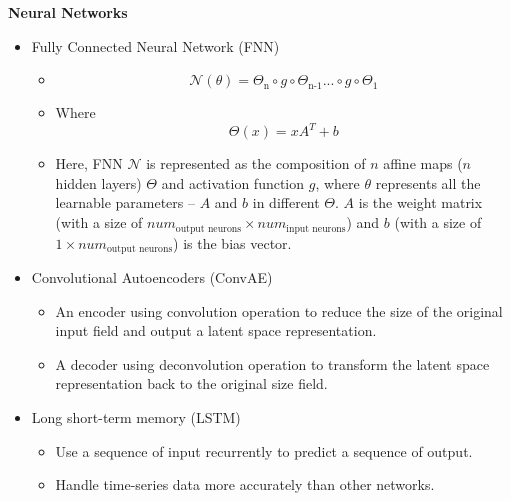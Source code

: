 {\textbf{Neural Networks}
\begin{itemize}
    \item Fully Connected Neural Network (FNN)
        \begin{itemize}
            \item\begin{equation}
            \mathcal{N}(\theta) = \Theta_\text{n} \circ g \circ \Theta_\text{n-1} ... \circ g \circ \Theta_1
            \end{equation}

            \item Where \begin{equation} \Theta(x) = xA^{T} + b \end{equation}

            \item Here, FNN $\mathcal{N}$ is represented as the composition of $n$ affine maps ($n$ hidden layers) $\Theta$ and activation function $g$, where $\theta$ represents all the learnable parameters -- $A$ and $b$ in different $\Theta$. $A$ is the weight matrix (with a size of $num_\text{output neurons} \times num_\text{input neurons}$) and $b$ (with a size of $1 \times num_\text{output neurons}$) is the bias vector.

        \end{itemize}
    \item Convolutional Autoencoders (ConvAE)
        \begin{itemize}
            \item An encoder using convolution operation to reduce the size of the original input field and output a latent space representation.

            \item A decoder using deconvolution operation to transform the latent space representation back to the original size field.
        \end{itemize}
    \item Long short-term memory (LSTM)
        \begin{itemize}
            \item Use a sequence of input recurrently to predict a sequence of output.

            \item Handle time-series data more accurately than other networks.
        \end{itemize}

\end{itemize}

}


